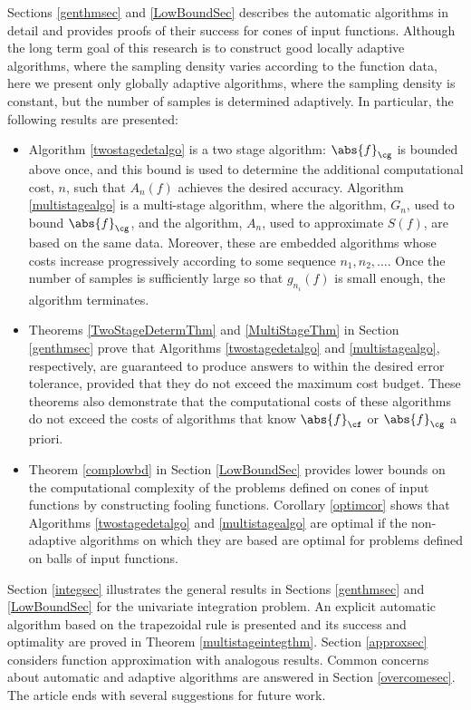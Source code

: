 \documentclass[]{elsarticle}
\theoremstyle{definition}
\theoremstyle{remark}
\newcommand{\Fnorm}[1]{\abs{#1}_{\cf}}
\newcommand{\Gnorm}[1]{\abs{#1}_{\cg}}
\begin{document}
Sections \ref{genthmsec} and \ref{LowBoundSec} describes the automatic algorithms in detail and provides proofs of their success for cones of input functions.  Although the long term goal of this research is to construct good locally adaptive algorithms, where the sampling density varies according to the function data, here we present only globally adaptive algorithms, where the sampling density is constant, but the number of samples is determined adaptively.  In particular, the following results are presented:
\begin{itemize}

\item Algorithm \ref{twostagedetalgo} is a two stage algorithm: $\Gnorm{f}$ is bounded above once, and  this bound is used to determine the additional computational cost, $n$, such that $A_n(f)$ achieves the desired accuracy. Algorithm \ref{multistagealgo} is a multi-stage algorithm, where the algorithm, $G_n$, used to bound $\Gnorm{f}$, and the algorithm, $A_n$, used to approximate $S(f)$, are based on the same data. Moreover, these are embedded algorithms whose costs increase progressively according to some sequence $n_1, n_2, \ldots$.  Once the number of samples is sufficiently large so that $g_{n_i}(f)$ is small enough, the algorithm terminates.

\item Theorems \ref{TwoStageDetermThm} and \ref{MultiStageThm} in Section \ref{genthmsec} prove that Algorithms \ref{twostagedetalgo} and \ref{multistagealgo}, respectively, are guaranteed to produce answers to within the desired error tolerance, provided that they do not exceed the maximum cost budget.  These theorems also demonstrate that the computational costs of these algorithms do not exceed the costs of algorithms that know $\Fnorm{f}$ or $\Gnorm{f}$ a priori.

\item Theorem \ref{complowbd} in Section \ref{LowBoundSec} provides lower bounds on the computational complexity of the problems defined on cones of input functions by constructing fooling functions.  Corollary \ref{optimcor} shows that Algorithms \ref{twostagedetalgo} and \ref{multistagealgo} are optimal if the non-adaptive algorithms on which they are based are optimal for problems defined on balls of input functions.

\end{itemize}

Section \ref{integsec} illustrates the general results in Sections \ref{genthmsec} and \ref{LowBoundSec} for the univariate integration problem.  An explicit automatic algorithm based on the trapezoidal rule is presented and its success and optimality are proved in Theorem \ref{multistageintegthm}.  Section \ref{approxsec}  considers function approximation with analogous results.  Common concerns about automatic and adaptive algorithms are answered in Section \ref{overcomesec}. The article ends with several suggestions for future work.
\end{document}
